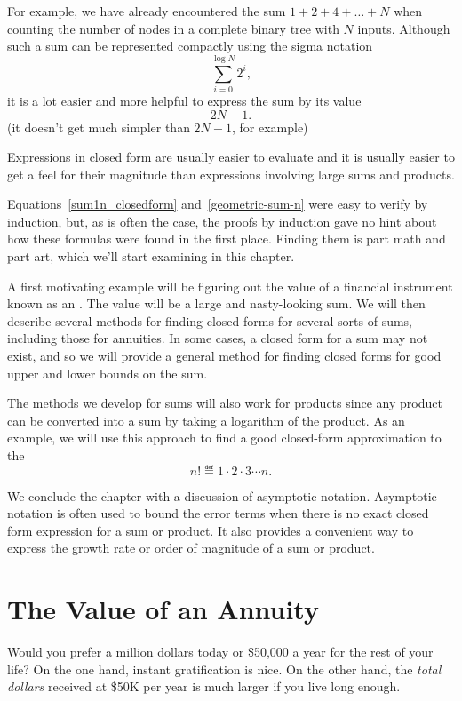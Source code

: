 For example, we have already encountered the sum $1 + 2 + 4 + \dots +
N$ when counting the number of nodes in a complete binary tree with
$N$ inputs.  Although such a sum can be represented compactly using
the sigma notation
\begin{equation}
    \sum_{i = 0}^{\log N} 2^i,
\end{equation}
it is a lot easier and more helpful to express the sum by
its  value
\[
    2 N - 1.
\]
(it doesn't get much simpler than $2 N - 1$, for example) 

Expressions in closed form are usually easier to evaluate and it is
usually easier to get a feel for their magnitude than expressions
involving large sums and products.\fi

Equations~\eqref{sum1n_closedform} and~\eqref{geometric-sum-n} were
easy to verify by induction, but, as is often the case, the proofs by
induction gave no hint about how these formulas were found in the
first place.  Finding them is part math and part art, which we'll
start examining in this chapter.

A first motivating example will be figuring out the value of a
financial instrument known as an .  The value will be a
large and nasty-looking sum.  We will then describe several methods
for finding closed forms for several sorts of sums, including those
for annuities.  In some cases, a closed form for a sum may not exist,
and so we will provide a general method for finding closed forms for
good upper and lower bounds on the sum.

The methods we develop for sums will also work for products since any
product can be converted into a sum by taking a logarithm of the
product.  As an example, we will use this approach to find a good
closed-form approximation to the 
\[
    n! \eqdef 1 \cdot 2 \cdot 3 \cdots n.
\]

We conclude the chapter with a discussion of asymptotic notation.
Asymptotic notation is often used to bound the error terms when there
is no exact closed form expression for a sum or product.  It also
provides a convenient way to express the growth rate or order of
magnitude of a sum or product.

\section{The Value of an Annuity}\label{annuity_sec}

Would you prefer a million dollars today or \$50,000 a year for the
rest of your life?  On the one hand, instant gratification is nice.
On the other hand, the \emph{total dollars} received at \$50K per year
is much larger if you live long enough.

